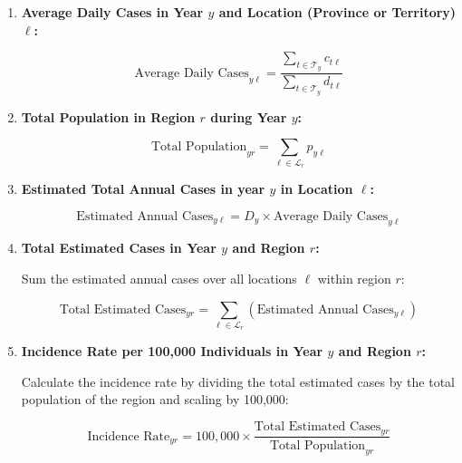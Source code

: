 \documentclass[12pt]{article}
\begin{document}
\begin{enumerate}
    \item \textbf{Average Daily Cases in Year \( y \) and Location (Province or Territory) \( \ell \):}

    \[
    \text{Average Daily Cases}_{y\ell} = \frac{\sum_{t \in {\mathcal T}_y} c_{t\ell}}{\sum_{t \in {\mathcal T}_y} d_{t\ell}}
    \]

    \item \textbf{Total Population in Region \( r \) during Year \( y \):}
    
    \[
    \text{Total Population}_{yr} = \sum_{\ell \in {\mathcal L}_r} p_{y\ell}
    \]

    \item \textbf{Estimated Total Annual Cases in year \( y \) in Location \( \ell \):}
  
    \[
    \text{Estimated Annual Cases}_{y\ell} = D_y \times \text{Average Daily Cases}_{y\ell}
    \]

    \item \textbf{Total Estimated Cases in Year \( y \) and Region \( r \):}

    Sum the estimated annual cases over all locations \( \ell \) within region \( r \):

    \[
    \text{Total Estimated Cases}_{yr} = \sum_{\ell \in {\mathcal L}_r} \left(\text{Estimated Annual Cases}_{y\ell} \right)
    \]

    \item \textbf{Incidence Rate per 100,000 Individuals in Year \( y \) and Region \( r \):}

    Calculate the incidence rate by dividing the total estimated cases by the total population of the region and scaling by 100,000:

    \[
    \text{Incidence Rate}_{yr} = 100,000 \times \frac{\text{Total Estimated Cases}_{yr}}{\text{Total Population}_{yr}}
    \]

\end{enumerate}

\clearpage



\end{document}
